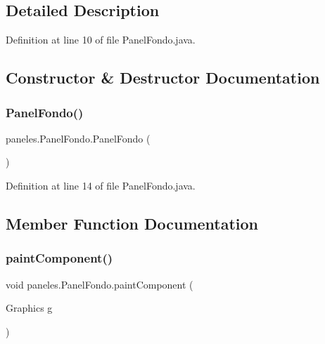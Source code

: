 \subsection{Detailed Description}


Definition at line 10 of file Panel\+Fondo.\+java.



\subsection{Constructor \& Destructor Documentation}
\mbox{\label{classpaneles_1_1_panel_fondo_a64adb64396f808c54e8d9c5383a45531}} 
\subsubsection{\texorpdfstring{Panel\+Fondo()}{PanelFondo()}}
{\footnotesize\ttfamily paneles.\+Panel\+Fondo.\+Panel\+Fondo (\begin{DoxyParamCaption}{ }\end{DoxyParamCaption})}



Definition at line 14 of file Panel\+Fondo.\+java.



\subsection{Member Function Documentation}
\mbox{\label{classpaneles_1_1_panel_fondo_aeaeb3ac61110f0e637b22afc5111e9d7}} 
\subsubsection{\texorpdfstring{paint\+Component()}{paintComponent()}}
{\footnotesize\ttfamily void paneles.\+Panel\+Fondo.\+paint\+Component (\begin{DoxyParamCaption}\item[{Graphics}]{g }\end{DoxyParamCaption})}




